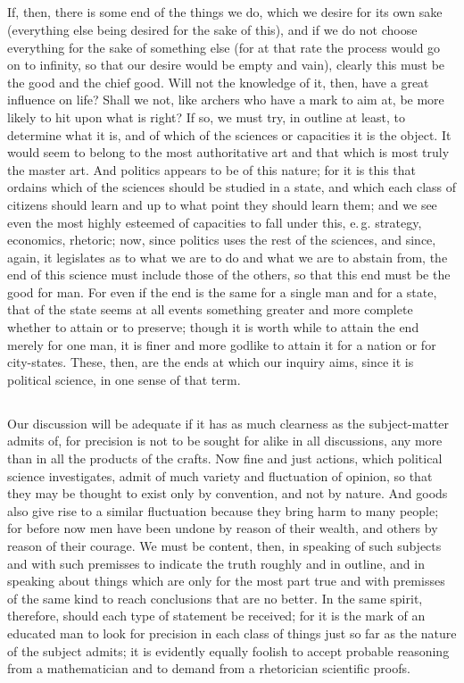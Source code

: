 \documentclass[12pt]{article}
\begin{document}
\subsection{}
  If, then, there is some end of the things we do, which we desire for
its own sake (everything else being desired for the sake of this), and
if we do not choose everything for the sake of something else (for
at that rate the process would go on to infinity, so that our desire
would be empty and vain), clearly this must be the good and the
chief good. Will not the knowledge of it, then, have a great influence
on life? Shall we not, like archers who have a mark to aim at, be more
likely to hit upon what is right? If so, we must try, in outline at
least, to determine what it is, and of which of the sciences or
capacities it is the object. It would seem to belong to the most
authoritative art and that which is most truly the master art. And
politics appears to be of this nature; for it is this that ordains
which of the sciences should be studied in a state, and which each
class of citizens should learn and up to what point they should
learn them; and we see even the most highly esteemed of capacities
to fall under this, e.\,g. strategy, economics, rhetoric; now, since
politics uses the rest of the sciences, and since, again, it
legislates as to what we are to do and what we are to abstain from,
the end of this science must include those of the others, so that this
end must be the good for man. For even if the end is the same for a
single man and for a state, that of the state seems at all events
something greater and more complete whether to attain or to
preserve; though it is worth while to attain the end merely for one
man, it is finer and more godlike to attain it for a nation or for
city-states. These, then, are the ends at which our inquiry aims,
since it is political science, in one sense of that term.

\subsection{}
  Our discussion will be adequate if it has as much clearness as the
subject-matter admits of, for precision is not to be sought for
alike in all discussions, any more than in all the products of the
crafts. Now fine and just actions, which political science
investigates, admit of much variety and fluctuation of opinion, so
that they may be thought to exist only by convention, and not by
nature. And goods also give rise to a similar fluctuation because they
bring harm to many people; for before now men have been undone by
reason of their wealth, and others by reason of their courage. We must
be content, then, in speaking of such subjects and with such premisses
to indicate the truth roughly and in outline, and in speaking about
things which are only for the most part true and with premisses of the
same kind to reach conclusions that are no better. In the same spirit,
therefore, should each type of statement be received; for it is the
mark of an educated man to look for precision in each class of
things just so far as the nature of the subject admits; it is
evidently equally foolish to accept probable reasoning from a
mathematician and to demand from a rhetorician scientific proofs.
\end{document}
